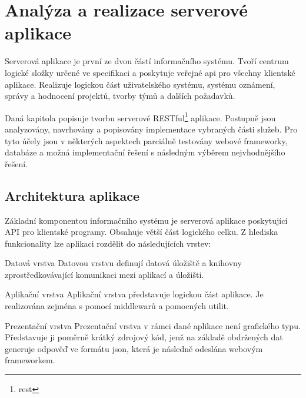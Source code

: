 \chapter{Analýza a realizace serverové aplikace}

Serverová aplikace je první ze dvou částí informačního systému. Tvoří centrum logické složky určené ve specifikaci a poskytuje veřejné \gls{api} pro všechny klientské aplikace. Realizuje logickou část uživatelského systému, systému oznámení, správy a hodnocení projektů, tvorby týmů a dalších požadavků. 

Daná kapitola popisuje tvorbu serverové RESTful\footnote{\gls{rest}} aplikace. Postupně jsou analyzovány, navrhovány a popisovány implementace vybraných části služeb. Pro tyto účely jsou v některých aspektech parciálně testovány webové frameworky, databáze a možná implementační řešení s následným výběrem nejvhodnějšího řešení.



\section{Architektura aplikace}

Základní komponentou informačního systému je serverová aplikace poskytující API pro klientské programy. Obsahuje větší část logického celku. Z hlediska funkcionality lze aplikaci rozdělit do následujících vrstev:

\begin{dl}
   \item [Datová vrstva] Datovou vrstvu definují datová úložiště a knihovny zprostředkovávající komunikaci mezi aplikací a úložišti.
   
   \item [Aplikační vrstva] Aplikační vrstva představuje logickou část aplikace. Je realizována zejména s pomocí middlewarů a pomocných utilit.
   
   \item [Prezentační vrstva] Prezentační vrstva v rámci dané aplikace není grafického typu. Představuje ji poměrně krátký zdrojový kód, jenž na základě obdržených dat generuje odpověď ve formátu \gls{json}, která je následně odeslána webovým frameworkem.
   
\end{dl}


